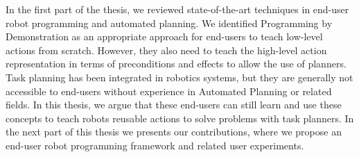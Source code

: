 In the first part of the thesis, we reviewed state-of-the-art techniques in end-user robot programming and automated planning.
We identified Programming by Demonstration as an appropriate approach for end-users to teach low-level actions from scratch.
However, they also need to teach the high-level action representation in terms of preconditions and effects to allow the use of planners.
Task planning has been integrated in robotics systems, but they are generally not accessible to end-users without experience in Automated Planning or related fields.
In this thesis, we argue that these end-users can still learn and use these concepts to teach robots reusable actions to solve problems with task planners.
In the next part of this thesis we presents our contributions, where we propose an end-user robot programming framework and related user experiments.



